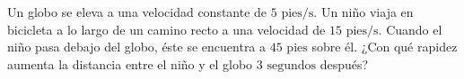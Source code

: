 \item Un globo se eleva a una velocidad constante de $5 \text{ pies/s}$. Un niño viaja en bicicleta a lo largo de un camino recto a una velocidad de $15 \text{ pies/s}$. Cuando el niño pasa debajo del globo, éste se encuentra a $45 \text{ pies}$ sobre él. ¿Con qué rapidez aumenta la distancia entre el niño y el globo $3 \text{ segundos}$ después?
